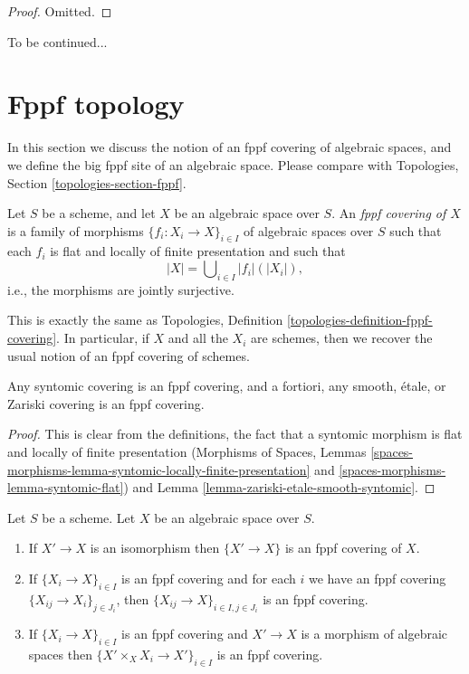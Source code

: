 \begin{proof}
Omitted.
\end{proof}

\noindent
To be continued...










\section{Fppf topology}
\label{section-fppf}

\noindent
In this section we discuss the notion of an fppf covering of algebraic spaces,
and we define the big fppf site of an algebraic space. Please compare with
Topologies, Section \ref{topologies-section-fppf}.

\begin{definition}
\label{definition-fppf-covering}
Let $S$ be a scheme, and let $X$ be an algebraic space over $S$.
An {\it fppf covering of $X$} is a family of morphisms
$\{f_i : X_i \to X\}_{i \in I}$ of algebraic spaces over $S$
such that each $f_i$ is flat and locally of finite presentation
and such that
$$
|X| = \bigcup\nolimits_{i \in I} |f_i|(|X_i|),
$$
i.e., the morphisms are jointly surjective.
\end{definition}

\noindent
This is exactly the same as
Topologies, Definition \ref{topologies-definition-fppf-covering}.
In particular, if $X$ and all the $X_i$ are schemes, then we recover the usual
notion of an fppf covering of schemes.

\begin{lemma}
\label{lemma-zariski-etale-smooth-syntomic-fppf}
Any syntomic covering is an fppf covering, and a fortiori,
any smooth, \'etale, or Zariski covering is an fppf covering.
\end{lemma}

\begin{proof}
This is clear from the definitions, the fact that a syntomic morphism
is flat and locally of finite presentation
(Morphisms of Spaces, Lemmas
\ref{spaces-morphisms-lemma-syntomic-locally-finite-presentation} and
\ref{spaces-morphisms-lemma-syntomic-flat}) and
Lemma \ref{lemma-zariski-etale-smooth-syntomic}.
\end{proof}

\begin{lemma}
\label{lemma-fppf}
Let $S$ be a scheme.
Let $X$ be an algebraic space over $S$.
\begin{enumerate}
\item If $X' \to X$ is an isomorphism then $\{X' \to X\}$
is an fppf covering of $X$.
\item If $\{X_i \to X\}_{i\in I}$ is an fppf covering and for each
$i$ we have an fppf covering $\{X_{ij} \to X_i\}_{j\in J_i}$, then
$\{X_{ij} \to X\}_{i \in I, j\in J_i}$ is an fppf covering.
\item If $\{X_i \to X\}_{i\in I}$ is an fppf covering
and $X' \to X$ is a morphism of algebraic spaces then
$\{X' \times_X X_i \to X'\}_{i\in I}$ is an fppf covering.
\end{enumerate}
\end{lemma}


